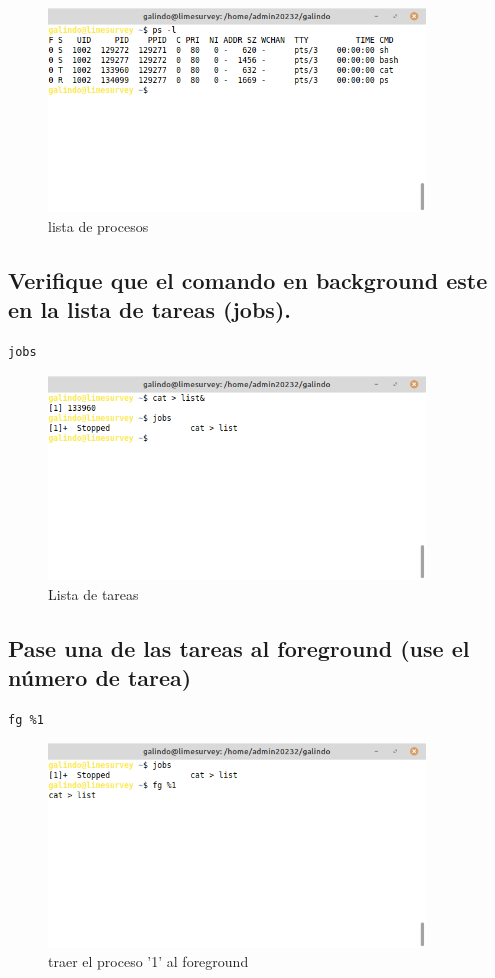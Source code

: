 \documentclass[11pt]{article}
\begin{document}
\begin{figure}[htbp]
\centering
\includegraphics[width=10cm]{img/psml.png}
\caption{lista de procesos}
\end{figure}

\pagebreak

\subsection{Verifique que el comando en background este en la lista de tareas (jobs).}
\label{sec:org63cfd33}
\begin{verbatim}
jobs
\end{verbatim}

\begin{figure}[htbp]
\centering
\includegraphics[width=10cm]{img/jobs.png}
\caption{Lista de tareas}
\end{figure}

\subsection{Pase una de las tareas al foreground (use el número de tarea)}
\label{sec:org6c1068c}
\begin{verbatim}
fg %1 
\end{verbatim}

\begin{figure}[htbp]
\centering
\includegraphics[width=10cm]{img/random.png}
\caption{traer el proceso '1' al foreground}
\end{figure}
\end{document}

